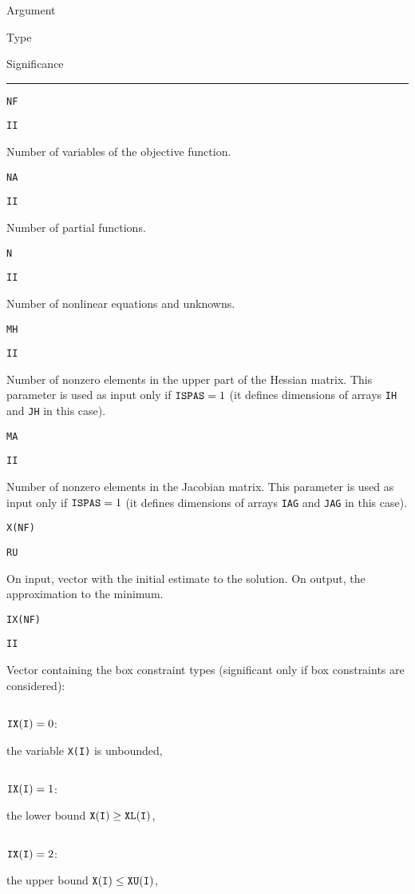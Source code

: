\documentclass{esub2acm}
\begin{document}
\noindent\parbox{20mm}{Argument}\parbox{10mm}{$\!$Type}\parbox[t]{125mm}
  {Significance}\par\noindent\rule[1mm]{155mm}{.4pt}
  \par
\noindent\parbox{20mm}{\tt NF}\parbox{10mm}{\tt II}\parbox[t]{125mm}{
  Number of variables of the objective function.}
  \par\vspace{2mm}
\noindent\parbox{20mm}{\tt NA}\parbox{10mm}{\tt II}\parbox[t]{125mm}{
  Number of partial functions.}
  \par\vspace{2mm}
\noindent\parbox{20mm}{\tt N}\parbox{10mm}{\tt II}\parbox[t]{125mm}{
  Number of nonlinear equations and unknowns.}
  \par\vspace{2mm}
\noindent\parbox{20mm}{\tt MH}\parbox{10mm}{\tt II}\parbox[t]{125mm}{
  Number of nonzero elements in the upper part of the Hessian matrix.
  This parameter is used as input only if ${\tt ISPAS}=1$ (it defines
  dimensions of arrays {\tt IH} and {\tt JH} in this case).}
  \par\vspace{2mm}
\noindent\parbox{20mm}{\tt MA}\parbox{10mm}{\tt II}\parbox[t]{125mm}{
  Number of nonzero elements in the Jacobian matrix. This parameter
  is used as input only if ${\tt ISPAS}=1$ (it defines dimensions of arrays
  {\tt IAG} and {\tt JAG} in this case).}
  \par\vspace{2mm}
\noindent\parbox{20mm}{\tt X(NF)}\parbox{10mm}{\tt RU}\parbox[t]{125mm}{
  On input, vector with the initial estimate to the solution.
  On output, the approximation to the minimum.}
  \par\vspace{2mm}
\noindent\parbox{20mm}{\tt IX(NF)}\parbox{10mm}{\tt II}\parbox[t]{125mm}{
  Vector containing the box constraint types (significant only if
  box constraints are considered):}
  \par\vspace{1mm}
\noindent\parbox{30mm}{$\;$}\parbox{24mm}{${\tt IX(I)}=0$:}\parbox[t]{101mm}{
  the variable {\tt X(I)} is unbounded,}
  \par
\noindent\parbox{30mm}{$\;$}\parbox{24mm}{${\tt IX(I)}=1$:}\parbox[t]{101mm}{
  the lower bound $\tt X(I)\ge \tt XL(I)$,}
  \par
\noindent\parbox{30mm}{$\;$}\parbox{24mm}{${\tt IX(I)}=2$:}\parbox[t]{101mm}{
  the upper bound $\tt X(I)\le \tt XU(I)$,}
  \par
\end{document}
